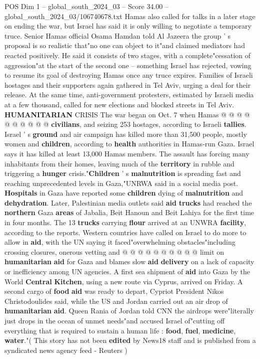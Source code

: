\begin{textsample}{POS Dim 1 – global\_south\_2024\_03 – Score 34.00 – global\_south\_2024\_03/106740678.txt}
Hamas also called for talks in a later stage on ending the war, but Israel has said it is only willing to negotiate a temporary truce.
Senior Hamas official Osama Hamdan told Al Jazeera the group ' s proposal is so realistic that"no one can object to it"and claimed mediators had reacted positively.
He said it consists of two stages, with a complete"cessation of aggression"at the start of the second one -- something Israel has rejected, vowing to resume its goal of destroying Hamas once any truce expires.
Families of Israeli hostages and their supporters again gathered in Tel Aviv, urging a deal for their release.
At the same time, anti-government protesters, estimated by Israeli media at a few thousand, called for new elections and blocked streets in Tel Aviv. \textbf{HUMANITARIAN} CRISIS The war began on Oct. 7 when Hamas @ @ @ @ @ @ @ @ @ @ \textbf{civilians}, and seizing 253 hostages, according to Israeli \textbf{tallies}.
Israel ' s \textbf{ground} and air campaign has killed more than 31,500 people, mostly women and \textbf{children}, according to \textbf{health} authorities in Hamas-run Gaza.
Israel says it has killed at least 13,000 Hamas members.
The assault has forcing many inhabitants from their homes, leaving much of the \textbf{territory} in rubble and triggering a \textbf{hunger} crisis."\textbf{Children} ' s \textbf{malnutrition} is spreading fast and reaching unprecedented levels in Gaza,"UNRWA said in a social media post. \textbf{Hospitals} in Gaza have reported some \textbf{children} dying of \textbf{malnutrition} and \textbf{dehydration}.
Later, Palestinian media outlets said \textbf{aid} \textbf{trucks} had reached the \textbf{northern} Gaza \textbf{areas} of Jabalia, Beit Hanoun and Beit Lahiya for the first time in four months.
The 13 \textbf{trucks} carrying \textbf{flour} arrived at an UNWRA \textbf{facility}, according to the reports.
Western countries have called on Israel to do more to allow in \textbf{aid}, with the UN saying it faced"overwhelming obstacles"including crossing closures, onerous vetting and @ @ @ @ @ @ @ @ @ @ limit on \textbf{humanitarian} \textbf{aid} for Gaza and blames slow \textbf{aid} \textbf{delivery} on a lack of capacity or inefficiency among UN agencies.
A first sea shipment of \textbf{aid} into Gaza by the World \textbf{Central} \textbf{Kitchen}, using a new route via Cyprus, arrived on Friday.
A second cargo of \textbf{food} \textbf{aid} was ready to depart, Cypriot President Nikos Christodoulides said, while the US and Jordan carried out an air drop of \textbf{humanitarian} \textbf{aid}.
Queen Rania of Jordan told CNN the airdrops were"literally just drops in the ocean of unmet needs"and accused Israel of"cutting off everything that is required to sustain a human life : \textbf{food}, \textbf{fuel}, \textbf{medicine}, \textbf{water}."( This story has not been \textbf{edited} by News18 staff and is published from a syndicated news agency feed - Reuters )


\end{textsample}
